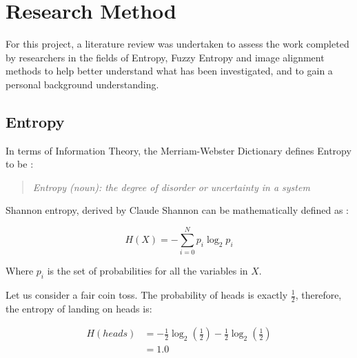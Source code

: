 \section{Research Method}


For this project, a literature review was undertaken to assess the work completed by researchers in the fields of Entropy, Fuzzy Entropy and image alignment methods to help better understand what has been investigated, and to gain a personal background understanding.

\subsection{Entropy}
\label{ssec:entropy}

In terms of Information Theory, the Merriam-Webster Dictionary defines Entropy to be \cite{def_entropy}:

\begin{quotation}
 \textit{Entropy (noun): the degree of disorder or uncertainty in a system}
\end{quotation}

Shannon entropy, derived by Claude Shannon \cite{shannon1948a} can be mathematically defined as :

\begin{equation}
  H(X) = - \displaystyle\sum_{i=0}^{N}{p_i \log_2 p_i}
\end{equation}

Where $p_i$ is the set of probabilities for all the variables in $X$.

Let us consider a fair coin toss. The probability of heads is exactly $\frac{1}{2}$, therefore, the entropy of landing on heads is:

\begin{equation}
  \begin{split}
    H(heads) &= -\frac{1}{2}\log_2(\frac{1}{2}) - \frac{1}{2}\log_2(\frac{1}{2}) \\
    &= 1.0
  \end{split}
\end{equation}

